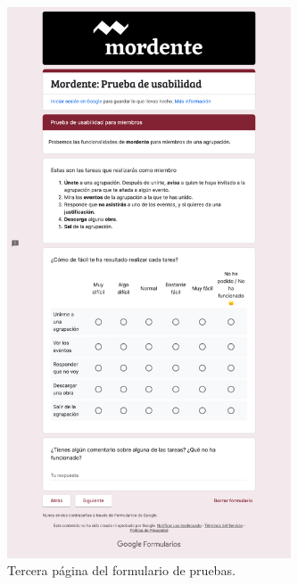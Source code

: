 \begin{figure}[h]
\centering
\includegraphics[width=0.75\textwidth]{imagenes/pruebas/form_3.png}
\caption{Tercera página del formulario de pruebas.}
\label{fig:form3}
\end{figure}

